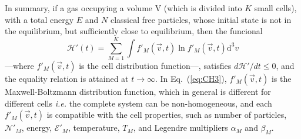 In summary, if a gas occupying a volume V (which is divided into $K$ small cells), with a
total energy $E$ and $N$ classical free particles, whose initial state is not in the equilibrium,
but sufficiently close to equilibrium, then the funcional
%
\begin{equation}\label{eq:CH3}
   \mathcal{H}'(t)=\sum_{M=1}^{K}\int f'_M(\vec{v},t) \ln f'_M(\vec{v},t)\mathrm{d}^3v
\end{equation}
%
---where $f'_M(\vec{v},t)$ is the cell distribution function---,
satisfies $d\mathcal{H}'/dt\leq0$, and the equality relation is attained at $t\to\infty$.
In Eq.~(\ref{eq:CH3}), $f'_M(\vec{v},t)$ is the Maxwell-Boltzmann distribution
function, which in general is different for different cells \textit{i.e.} the complete system
can be non-homogeneous, and each $f'_M(\vec v,t)$ is compatible
with the cell properties, such as number of particles, $\mathcal{N}'_M$, energy, $\mathcal{E}'_M$, temperature,
$T_M$, and Legendre multipliers $\alpha_M$ and $\beta_M$. 


\begin{comment}
Joining both results, we can say the following statement:
Consider a classical gas in a total volume $V$ (divided in $K$ cells of equal
volume elements), total energy $E$ and total number of free particles $N$.
Consider also the system has inhomogeneities and suffers a relaxation process.
If we define the following functional
%
\begin{equation}\label{CH3}
   \mathcal{H}'(t)=\sum_{M=1}^{K}\int f_M(\vec{v},t) \ln f_M(\vec{v},t)\mathrm{d}^3v,
\end{equation}
%
where $f_M(\vec{v},t)$ is the local distribution function of each cell in the
system, then in the first-order approximation
%
\begin{equation}
    \frac{d\mathcal{H}'}{dt} \leq 0.
\end{equation}
%
This statement will be the classical $H$-theorem with inhomogeneities.

In the next section, we present a proposal quantum version of the
$H$-theorem defined by Tolman and our proposal quantum version of the $H$
theorem applying the method of the volume divided into cells.
\end{comment}


